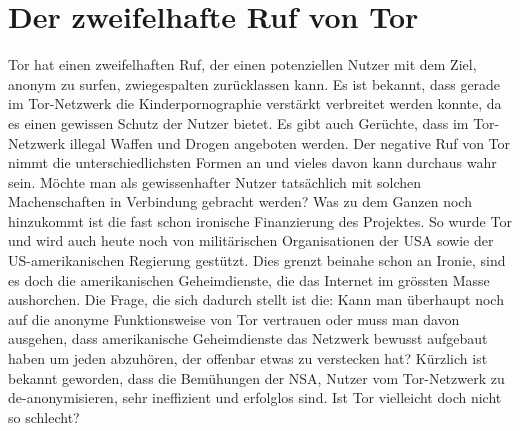 \section{Der zweifelhafte Ruf von Tor}
Tor hat einen zweifelhaften Ruf, der einen potenziellen Nutzer mit dem Ziel, anonym zu surfen, zwiegespalten zurücklassen kann. Es ist bekannt, dass gerade im Tor-Netzwerk die Kinderpornographie verstärkt verbreitet werden konnte, da es einen gewissen Schutz der Nutzer bietet. Es gibt auch Gerüchte, dass im Tor-Netzwerk illegal Waffen und Drogen angeboten werden. Der negative Ruf von Tor nimmt die unterschiedlichsten Formen an und vieles davon kann durchaus wahr sein. Möchte man als gewissenhafter Nutzer tatsächlich mit solchen Machenschaften in Verbindung gebracht werden? Was zu dem Ganzen noch hinzukommt ist die fast schon ironische Finanzierung des Projektes. So wurde Tor und wird auch heute noch von militärischen Organisationen der USA sowie der US-amerikanischen Regierung  gestützt. Dies grenzt beinahe schon an Ironie, sind es doch die amerikanischen Geheimdienste, die das Internet im grössten Masse aushorchen. Die Frage, die sich dadurch stellt ist die: Kann man überhaupt noch auf die anonyme Funktionsweise von Tor vertrauen oder muss man davon ausgehen, dass amerikanische Geheimdienste das Netzwerk bewusst aufgebaut haben um jeden abzuhören, der offenbar etwas zu verstecken hat? Kürzlich ist bekannt geworden, dass die Bemühungen der NSA, Nutzer vom Tor-Netzwerk zu de-anonymisieren, sehr ineffizient und erfolglos sind. Ist Tor vielleicht doch nicht so schlecht?

